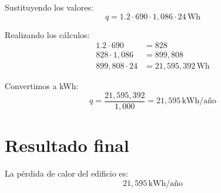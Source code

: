\documentclass[a4paper,12pt]{article}
\begin{document}
Sustituyendo los valores:
\[
q = 1.2 \cdot 690 \cdot 1,086 \cdot 24 \, \text{Wh}
\]

Realizando los cálculos:
\begin{align*}
1.2 \cdot 690 & = 828 \\
828 \cdot 1,086 & = 899,808 \\
899,808 \cdot 24 & = 21,595,392 \, \text{Wh}
\end{align*}

Convertimos a kWh:
\[
q = \frac{21,595,392}{1,000} = 21,595 \, \text{kWh/año}
\]

\section*{Resultado final}
La pérdida de calor del edificio es:
\[
\boxed{21,595 \, \text{kWh/año}}
\]
\end{document}
